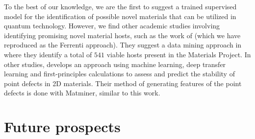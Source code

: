 To the best of our knowledge, we are the first to suggest a trained supervised model for the identification of possible novel materials that can be utilized in quantum technology. However, we find other academic studies involving identifying promising novel material hosts, such as the work of \citeauthor{Ferrenti2020} \cite{Ferrenti2020} (which we have reproduced as the Ferrenti approach). They suggest a data mining approach in where they identify a total of $541$ viable hosts present in the Materials Project. In other studies, \citeauthor{FreyNathanC2020MLDo} \cite{FreyNathanC2020MLDo} develops an approach using machine learning, deep transfer learning and first-principles calculations to assess and predict the stability of point defects in 2D materials. Their method of generating features of the point defects is done with Matminer, similar to this work.


\section*{Future prospects}

